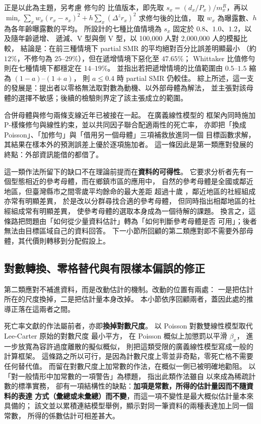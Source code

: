 \documentclass[UTF8, fontset=macnew, a4paper, 12pt]{ctexart}
\begin{document}
\citet{yue2019} 正是以此為主題，另考慮 \citet{whittaker1923} 修勻的
比值版本，即先取 $s_x=(d_x/P_x)/m^R_x$，再以
$\min_r \sum_x w_x(r_x-s_x)^2+h\sum_x(\Delta^z r_x)^2$ 求修勻後的比值，
取 $w_x$ 為曝露數、$h$ 為各年齡曝露數的平均。
所設計的七種比值情境為 $s_x$ 固定於 $0.8$、$1.0$、$1.2$，以及隨年齡遞增、
遞減、V 型與倒 V 型，以 100,000 人對 2,000,000 人的模擬比較，
結論是：在前三種情境下 partial SMR 的平均絕對百分比誤差明顯最小
（約 $12\%$，不修勻為 $25$--$29\%$），但在遞增情境下惡化至 $47.65\%$；
Whittaker 比值修勻則在七種情境下都穩定在 $14$--$19\%$。
並指出若把遞增情境的比值範圍由 $0.5$--$1.5$ 縮為 $(1-a)$--$(1+a)$，
則 $a\le 0.4$ 時 partial SMR 仍較佳。
綜上所述，這一支的發展是：提出者以零格無法取對數為動機、以外部母體為解法，
並主張對該母體的選擇不敏感；後續的檢驗則界定了該主張成立的範圍。

合併母體與修勻兩條支線近年已被接在一起。\citet{pitt2018} 在廣義線性模型的
框架內同時施加 P-樣條修勻與線性約束，並以共同因子聯合配適兩性的死亡率，
亦即把「換成 Poisson」、「加修勻」與「借用另一個母體」三項補救放進同一個
目標函數求解，其結果在樣本外的預測誤差上優於逐項施加者。
這一條因此是第一類應對發展的終點：外部資訊能借的都借了。

這一類作法所留下的缺口不在理論前提而在\textbf{資料的可得性}。
它要求分析者先有一個型態相近的參考母體，而在鄉鎮市區的應用中，
自然的參考母體是全國或鄰近地區，但臺灣縣市之間零歲平均餘命的最大差距
超過十歲 \citep{yue2019}，鄰近地區的社經組成亦常有明顯差異，
\citet{wangyue2026} 於是改以分群尋找合適的參考母體，
但同時指出相鄰地區的社經組成常有明顯差異，
使參考母體的選取本身成為一個待解的課題。
換言之，這條路把問題由「如何從少量資料估計」轉為「如何判斷參考母體是否
可用」；後者無法由目標區域自己的資料回答。
下一小節所回顧的第二類應對即不需要外部母體，其代價則轉移到分配假設上。

\subsection{對數轉換、零格替代與有限樣本偏誤的修正}\label{sec:logzero}\label{sec:biasred}

第二類應對不補進資料，而是改動估計的機制。改動的位置有兩處：
一是把估計所在的尺度換掉，二是把估計量本身改掉。
本小節依序回顧兩者，蓋因此處的推導正落在這兩者之間。

死亡率文獻的作法屬前者，亦即\textbf{換掉對數尺度}。
\citet{brouhns2002} 以 Poisson 對數雙線性模型取代 Lee-Carter 原始的對數尺度
最小平方，\citet{delwarde2007} 在 Poisson 概似上加懲罰以平滑 $\beta_x$，
\citet{djeundje2010} 進一步放寬為容許過度離散的擬似概似，
\citet{currie2013} 則把這類受限的廣義線性模型寫成一般的計算框架。
這條路之所以可行，是因為計數尺度上零並非奇點，零死亡格不需要任何替代值。
而留在對數尺度上加常數的作法，在概似一側已被明確地勸阻。
\citet[\S6.2]{kosmidis2014} 以「對一般情形中加常數的一項警告」為標題，
指出此類作法雖自 \citet{haldane1956} 以來成為稀疏計數的標準實務，
卻有一項結構性的缺點：\textbf{加項是常數，所得的估計量因而不隨資料的表達
方式（彙總或未彙總）而不變}，而這一項不變性是最大概似估計量本來具備的；
該文並以累積連結模型舉例，顯示對同一筆資料的兩種表達加上同一個常數，
所得的係數估計可相差甚大。
\end{document}
